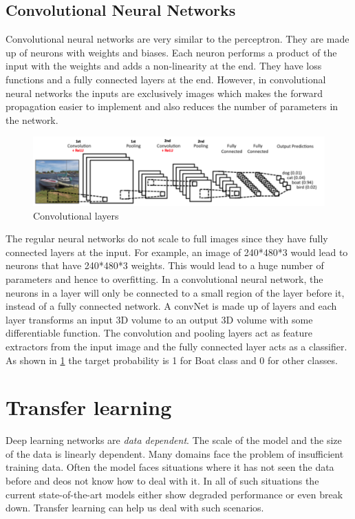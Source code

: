 \documentclass[a4paper, 12pt, oneside, BCOR1cm,toc=chapterentrywithdots]{scrbook}
\begin{document}
\section{Convolutional Neural Networks}

Convolutional neural networks are very similar to the perceptron. They are made up of neurons with weights and biases. Each neuron performs a product of the input with the weights and adds a non-linearity at the end. They have loss functions and a fully connected layers at the end. However, in convolutional neural networks the inputs are exclusively images which makes the forward propagation easier to implement and also reduces the number of parameters in the network.


\begin{figure}[h]
\centering
\includegraphics[width=1\textwidth]{image8.png}
\caption{Convolutional layers}
\label{fig:pic8}
\end{figure}


The regular neural networks do not scale to full images since they have fully connected layers at the input. For example, an image of 240*480*3 would lead to neurons that have 240*480*3 weights. This would lead to a huge number of parameters and hence to overfitting. In a convolutional neural network, the neurons in a layer will only be connected to a small region of the layer before it, instead of a fully connected network. A convNet is made up of layers and each layer transforms an input 3D volume to an output 3D volume with some differentiable function. The convolution and pooling layers act as feature extractors from the input image and the fully connected layer acts as a classifier. As shown in \ref{fig:pic8} the target probability is 1 for Boat class and 0 for other classes.


\chapter{Transfer learning}

Deep learning networks are \textit{data dependent}. The scale of the model and the size of the data is linearly dependent. Many domains face the problem of insufficient training data. Often the model faces situations where it has not seen the data before and deos not know how to deal with it. In all of such situations the current state-of-the-art models either show degraded performance or even break down. Transfer learning can help us deal with such scenarios.
\end{document}
